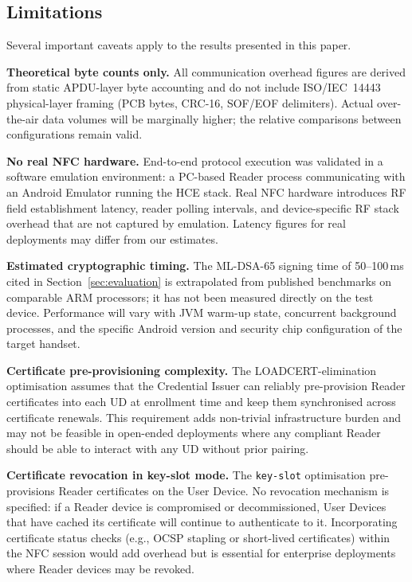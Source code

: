 \documentclass[runningheads]{llncs}
\begin{document}
\subsection{Limitations}
\label{subsec:limitations}

Several important caveats apply to the results presented in this paper.

\textbf{Theoretical byte counts only.}
All communication overhead figures are derived from static APDU-layer byte accounting and do not include ISO/IEC~14443 physical-layer framing (PCB bytes, CRC-16, SOF/EOF delimiters). Actual over-the-air data volumes will be marginally higher; the relative comparisons between configurations remain valid.

\textbf{No real NFC hardware.}
End-to-end protocol execution was validated in a software emulation environment: a PC-based Reader process communicating with an Android Emulator running the HCE stack. Real NFC hardware introduces RF field establishment latency, reader polling intervals, and device-specific RF stack overhead that are not captured by emulation. Latency figures for real deployments may differ from our estimates.

\textbf{Estimated cryptographic timing.}
The ML-DSA-65 signing time of 50--100\,ms cited in Section~\ref{sec:evaluation} is extrapolated from published benchmarks on comparable ARM processors; it has not been measured directly on the test device. Performance will vary with JVM warm-up state, concurrent background processes, and the specific Android version and security chip configuration of the target handset.

\textbf{Certificate pre-provisioning complexity.}
The LOADCERT-elimination optimisation assumes that the Credential Issuer can reliably pre-provision Reader certificates into each UD at enrollment time and keep them synchronised across certificate renewals. This requirement adds non-trivial infrastructure burden and may not be feasible in open-ended deployments where any compliant Reader should be able to interact with any UD without prior pairing.

\textbf{Certificate revocation in key-slot mode.}
The \texttt{key-slot} optimisation pre-provisions Reader certificates on the User Device.
No revocation mechanism is specified: if a Reader device is compromised or decommissioned,
User Devices that have cached its certificate will continue to authenticate to it.
Incorporating certificate status checks (e.g., OCSP stapling or short-lived certificates)
within the NFC session would add overhead but is essential for enterprise deployments
where Reader devices may be revoked.
\end{document}
